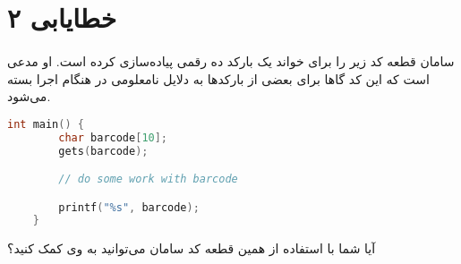 \documentclass[../main.tex]{subfiles}
\begin{document}
\section{خطایابی ۲}
\paragraph{}
سامان قطعه کد زیر را برای خواند یک بارکد ده رقمی پیاده‌سازی کرده است.
او مدعی است که این کد گاها برای بعضی از بارکدها به دلایل نامعلومی در هنگام اجرا بسته می‌شود.

\begin{latin}
\begin{lstlisting}[language=c]
    int main() {
        char barcode[10];
        gets(barcode);

        // do some work with barcode

        printf("%s", barcode);
    }
\end{lstlisting}
\end{latin}

آیا شما با استفاده از همین قطعه کد سامان می‌توانید به وی کمک کنید؟
\end{document}
